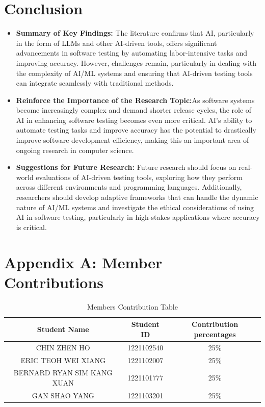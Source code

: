 \documentclass[12pt,a4paper]{article}
\begin{document}
\section{Conclusion}
\begin{itemize}
    \item \textbf{Summary of Key Findings:} The literature confirms that AI, particularly in the form of LLMs and other AI-driven tools, offers significant advancements in software testing by automating labor-intensive tasks and improving accuracy. However, challenges remain, particularly in dealing with the complexity of AI/ML systems and ensuring that AI-driven testing tools can integrate seamlessly with traditional methods.

    \item \textbf{Reinforce the Importance of the Research Topic:}As software systems become increasingly complex and demand shorter release cycles, the role of AI in enhancing software testing becomes even more critical. AI’s ability to automate testing tasks and improve accuracy has the potential to drastically improve software development efficiency, making this an important area of ongoing research in computer science.
    
    \item \textbf{Suggestions for Future Research:} Future research should focus on real-world evaluations of AI-driven testing tools, exploring how they perform across different environments and programming languages. Additionally, researchers should develop adaptive frameworks that can handle the dynamic nature of AI/ML systems and investigate the ethical considerations of using AI in software testing, particularly in high-stakes applications where accuracy is critical.

\end{itemize}

\newpage
{} %

\appendix
\section{Appendix A: Member Contributions}
\begin{table}[h]
    \centering
    \begin{tabular}{|c|c|c|}
        \hline
        Student Name & Student ID & Contribution percentages \\
        \hline
        CHIN ZHEN HO & 1221102540 & 25\% \\
        \hline
        ERIC TEOH WEI XIANG & 1221102007 & 25\% \\
        \hline
        BERNARD RYAN SIM KANG XUAN & 1221101777 & 25\% \\
        \hline
        GAN SHAO YANG & 1221103201 & 25\% \\
        \hline

    \end{tabular}
    \caption{Members Contribution Table}
    \label{tab:my_label}
\end{table}
\end{document}

